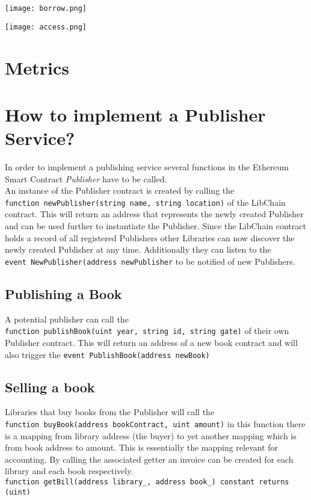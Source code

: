 \vspace{0.3cm}
\begin{center}
\texttt{[image: borrow.png]}
\end{center}

\vspace{0.3cm}
\begin{center}
\texttt{[image: access.png]}
\end{center}

\section{Metrics}

\section{How to implement a Publisher Service?}
In order to implement a publishing service several functions in the Ethereum Smart Contract \textit{Publisher} have to be called. \\
An instance of the Publisher contract is created by calling the \\
 \verb|function newPublisher(string name, string location)| of the LibChain contract. This will return an address that represents the newly created Publisher and can be used further to instantiate the Publisher. Since the LibChain contract holds a record of all registered Publishers other Libraries can now discover the newly created Publisher at any time. Additionally they can listen to the \\
 \verb|event NewPublisher(address newPublisher| to be notified of new Publishers.
\subsection{Publishing a Book}
A potential publisher can call the\\ 
 \verb|function publishBook(uint year, string id, string gate)| of their own Publisher contract. This will return an address of a new book contract and will also trigger the 
 \verb|event PublishBook(address newBook)|
\subsection{Selling a book}
Libraries that buy books from the Publisher will call the \\
\verb|function buyBook(address bookContract, uint amount)|  in this function there is a mapping from library address (the buyer) to yet another mapping which is from book address to amount. This is essentially the mapping relevant for accounting. By calling the associated getter an invoice can be created for each library and each book respectively.\\
 \verb|function getBill(address library_, address book_) constant returns (uint)|
